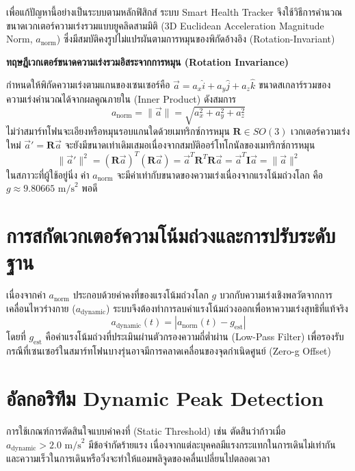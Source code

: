 เพื่อแก้ปัญหานี้อย่างเป็นระบบตามหลักฟิสิกส์ ระบบ Smart Health Tracker จึงใช้วิธีการคำนวณขนาดเวกเตอร์ความเร่งรวมแบบยูคลิดสามมิติ (3D Euclidean Acceleration Magnitude Norm, $a_{\text{norm}}$) ซึ่งมีสมบัติคงรูปไม่แปรผันตามการหมุนของพิกัดอ้างอิง (Rotation-Invariant)

\begin{theorybox}
\textbf{ทฤษฎีเวกเตอร์ขนาดความเร่งรวมอิสระจากการหมุน (Rotation Invariance)}

กำหนดให้พิกัดความเร่งตามแกนของเซนเซอร์คือ $\vec{a} = a_x\hat{i} + a_y\hat{j} + a_z\hat{k}$ ขนาดสเกลาร์รวมของความเร่งคำนวณได้จากผลคูณภายใน (Inner Product) ดังสมการ
\begin{equation}
a_{\text{norm}} = \|\vec{a}\| = \sqrt{a_x^2 + a_y^2 + a_z^2}
\end{equation}
ไม่ว่าสมาร์ทโฟนจะเอียงหรือหมุนรอบแกนใดด้วยเมทริกซ์การหมุน $\mathbf{R} \in SO(3)$ เวกเตอร์ความเร่งใหม่ $\vec{a}' = \mathbf{R}\vec{a}$ จะยังมีขนาดเท่าเดิมเสมอเนื่องจากสมบัติออร์โทโกนัลของเมทริกซ์การหมุน
\begin{equation}
\|\vec{a}'\|^2 = (\mathbf{R}\vec{a})^T (\mathbf{R}\vec{a}) = \vec{a}^T \mathbf{R}^T \mathbf{R} \vec{a} = \vec{a}^T \mathbf{I} \vec{a} = \|\vec{a}\|^2
\end{equation}
ในสภาวะที่ผู้ใช้อยู่นิ่ง ค่า $a_{\text{norm}}$ จะมีค่าเท่ากับขนาดของความเร่งเนื่องจากแรงโน้มถ่วงโลก คือ $g \approx 9.80665\text{ m/s}^2$ พอดี
\end{theorybox}

\section{การสกัดเวกเตอร์ความโน้มถ่วงและการปรับระดับฐาน}
เนื่องจากค่า $a_{\text{norm}}$ ประกอบด้วยค่าคงที่ของแรงโน้มถ่วงโลก $g$ บวกกับความเร่งเชิงพลวัตจากการเคลื่อนไหวร่างกาย ($a_{\text{dynamic}}$) ระบบจึงต้องทำการลบค่าแรงโน้มถ่วงออกเพื่อหาความเร่งสุทธิที่แท้จริง
\begin{equation}
a_{\text{dynamic}}(t) = |a_{\text{norm}}(t) - g_{\text{est}}|
\end{equation}
โดยที่ $g_{\text{est}}$ คือค่าแรงโน้มถ่วงที่ประเมินผ่านตัวกรองความถี่ต่ำผ่าน (Low-Pass Filter) เพื่อรองรับกรณีที่เซนเซอร์ในสมาร์ทโฟนบางรุ่นอาจมีการคลาดเคลื่อนของจุดกำเนิดศูนย์ (Zero-g Offset)

\section{อัลกอริทึม Dynamic Peak Detection}
การใช้เกณฑ์การตัดสินใจแบบค่าคงที่ (Static Threshold) เช่น ตัดสินว่าก้าวเมื่อ $a_{\text{dynamic}} > 2.0\text{ m/s}^2$ มีข้อจำกัดร้ายแรง เนื่องจากแต่ละบุคคลมีแรงกระแทกในการเดินไม่เท่ากัน และความเร็วในการเดินหรือวิ่งจะทำให้แอมพลิจูดของคลื่นเปลี่ยนไปตลอดเวลา

